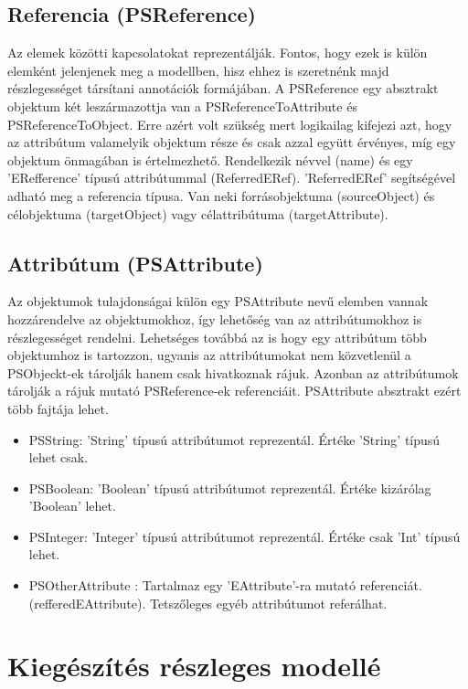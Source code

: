 \subsection{Referencia (PSReference)}
 Az elemek közötti kapcsolatokat reprezentálják. Fontos, hogy ezek is külön elemként jelenjenek meg a modellben, hisz ehhez is szeretnénk majd részlegességet társítani annotációk formájában. A PSReference egy absztrakt objektum két leszármazottja van a  PSReferenceToAttribute és PSReferenceToObject. Erre azért volt szükség mert logikailag kifejezi azt, hogy az attribútum valamelyik objektum része és csak azzal együtt érvényes, míg egy objektum önmagában is értelmezhető. Rendelkezik névvel (name) és egy 'ERefference' típusú attribútummal (ReferredERef). 'ReferredERef' segítségével adható meg a referencia típusa. Van neki forrásobjektuma (sourceObject) és célobjektuma (targetObject) vagy célattribútuma (targetAttribute).

\subsection{Attribútum (PSAttribute)}
Az objektumok tulajdonságai külön egy PSAttribute nevű elemben vannak hozzárendelve az objektumokhoz, így lehetőség van az attribútumokhoz is részlegességet rendelni. Lehetséges továbbá az is hogy egy attribútum több objektumhoz is tartozzon, ugyanis az attribútumokat nem közvetlenül a PSObjeckt-ek tárolják hanem csak hivatkoznak rájuk. Azonban az attribútumok tárolják a rájuk mutató PSReference-ek referenciáit. PSAttribute absztrakt ezért több fajtája lehet.

\begin{itemize}  
	\item PSString: 'String' típusú attribútumot reprezentál. Értéke 'String' típusú lehet csak.
	\item PSBoolean: 'Boolean' típusú attribútumot reprezentál. Értéke kizárólag 'Boolean' lehet.
	\item PSInteger: 'Integer' típusú attribútumot reprezentál. Értéke csak 'Int' típusú lehet.
	\item PSOtherAttribute : Tartalmaz egy 'EAttribute'-ra mutató referenciát. (refferedEAttribute). Tetszőleges egyéb attribútumot referálhat.
\end{itemize}


\section{Kiegészítés részleges modellé}

